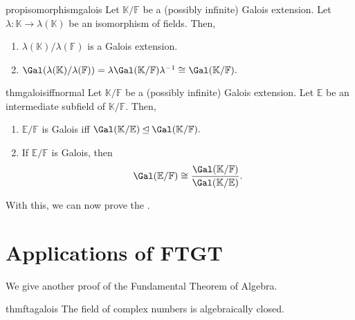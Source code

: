 \begin{restatable}[]{prop}{isomorphismgalois}
\label{prop:isomorphismgalois}
    Let $\mathbb{K}/\mathbb{F}$ be a {\color{purple}(possibly infinite)} Galois extension. Let $\lambda : \mathbb{K} \to \lambda(\mathbb{K})$ be an isomorphism of fields. Then,
    \begin{enumerate}
         \item $\lambda(\mathbb{K})/\lambda(\mathbb{F})$ is a Galois extension.
         \item $\Gal(\lambda(\mathbb{K})/\lambda(\mathbb{F})) = \lambda \Gal(\mathbb{K}/\mathbb{F}) \lambda^{-1} \cong \Gal(\mathbb{K}/\mathbb{F}).$ \hfill\hyperref[prop:isomorphismgalois2]{\downsym}
    \end{enumerate} 
\end{restatable}

\begin{restatable}[]{thm}{galoisiffnormal}
\label{thm:galoisiffnormal}
    Let $\mathbb{K}/\mathbb{F}$ be a {\color{purple}(possibly infinite)} Galois extension. Let $\mathbb{E}$ be an intermediate subfield of $\mathbb{K}/\mathbb{F}.$ Then,
    \begin{enumerate}
        \item $\mathbb{E}/\mathbb{F}$ is Galois iff $\Gal(\mathbb{K}/\mathbb{E}) \unlhd \Gal(\mathbb{K}/\mathbb{F}).$
        \item If $\mathbb{E}/\mathbb{F}$ is Galois, then
        \begin{equation*} 
             \Gal(\mathbb{E}/\mathbb{F}) \cong \frac{\Gal(\mathbb{K}/\mathbb{F})}{\Gal(\mathbb{K}/\mathbb{E})}.
        \end{equation*}
        \hfill\hyperref[thm:galoisiffnormal2]{\downsym}
     \end{enumerate} 
\end{restatable}

With this, we can now prove the . \hfill\hyperref[thm:FTGT2]{\downsym}


\section{Applications of FTGT}
We give another proof of the Fundamental Theorem of Algebra.

\begin{restatable}{thm}{ftagalois}
\label{thm:ftagalois}
    The field of complex numbers is algebraically closed. \hfill\hyperref[thm:ftagalois2]{\downsym}
\end{restatable}

